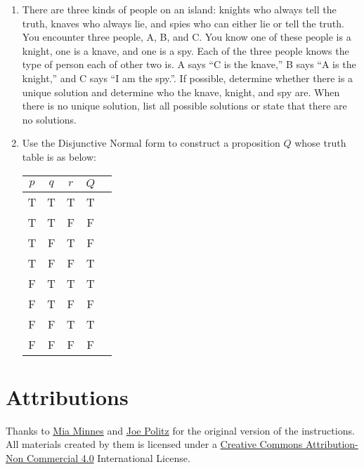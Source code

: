 \documentclass[12pt, oneside]{article}
\begin{document}
\begin{enumerate}
\item There are three kinds of people on an island: knights who always tell the truth, knaves who always lie, and spies who can either lie or tell the truth. You encounter three people, A, B, and C. You know one of these people is a knight, one is a knave, and one is a spy. Each of the three people knows the type of person each of other two is. A says “C is the knave,” B says “A is the knight,” and C says “I am the spy.”. If possible, determine whether there is a unique solution and determine who the knave, knight, and spy are. When there is no unique solution, list all possible solutions or state that there are no solutions.


\item Use the Disjunctive Normal form to construct a proposition $Q$ whose truth table is as below:

\begin{center}
\begin{tabular}{|c|c|c|c|c|}
\hline
$p$ & $q$ & $r$ & $Q$ \\ \hline \hline
T&T&T& T \\ \hline
T&T&F& F \\ \hline
T&F&T& F \\ \hline
T&F&F& T \\ \hline
F&T&T& T \\ \hline
F&T&F& F \\ \hline
F&F&T& T \\ \hline
F&F&F& F \\ \hline
\end{tabular}
\end{center}

\end{enumerate}

\section*{Attributions}

Thanks to \href{http://cseweb.ucsd.edu/~minnes/}{Mia Minnes} and \href{https://jpolitz.github.io/}{Joe Politz} for the original version of the instructions. All materials created by them is licensed under a \href{http://creativecommons.org/licenses/by-nc/4.0/}{Creative Commons Attribution-Non Commercial 4.0} International License.
\end{document}
